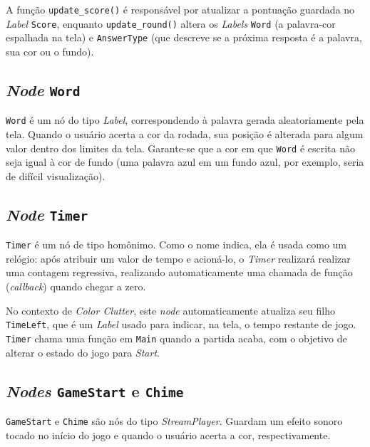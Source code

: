 A função \texttt{update\_score()} é responsável por atualizar a pontuação guardada no \textit{Label} \texttt{Score}, enquanto \texttt{update\_round()} altera os \textit{Labels} \texttt{Word} (a palavra-cor espalhada na tela) e \texttt{AnswerType} (que descreve se a próxima resposta é a palavra, sua cor ou o fundo).


\subsection{\textit{Node} \texttt{Word}}

\texttt{Word} é um nó do tipo \textit{Label}, correspondendo à palavra gerada aleatoriamente pela tela. Quando o usuário acerta a cor da rodada, sua posição é alterada para algum valor dentro dos limites da tela. Garante-se que a cor em que \texttt{Word} é escrita não seja igual à cor de fundo (uma palavra azul em um fundo azul, por exemplo, seria de difícil visualização).


\subsection{\textit{Node} \texttt{Timer}}

\texttt{Timer} é um nó de tipo homônimo. Como o nome indica, ela é usada como um relógio: após atribuir um valor de tempo e acioná-lo, o \textit{Timer} realizará realizar uma contagem regressiva, realizando automaticamente uma chamada de função (\textit{callback}) quando chegar a zero.

No contexto de \textit{Color Clutter}, este \textit{node} automaticamente atualiza seu filho \texttt{TimeLeft}, que é um \textit{Label} usado para indicar, na tela, o  tempo restante de jogo. \texttt{Timer} chama uma função em \texttt{Main} quando a partida acaba, com o objetivo de alterar o estado do jogo para \textit{Start}.


\subsection{\textit{Nodes} \texttt{GameStart} e \texttt{Chime}}

\texttt{GameStart} e \texttt{Chime} são nós do tipo \textit{StreamPlayer}. Guardam um efeito sonoro tocado no início do jogo e quando o usuário acerta a cor, respectivamente.

